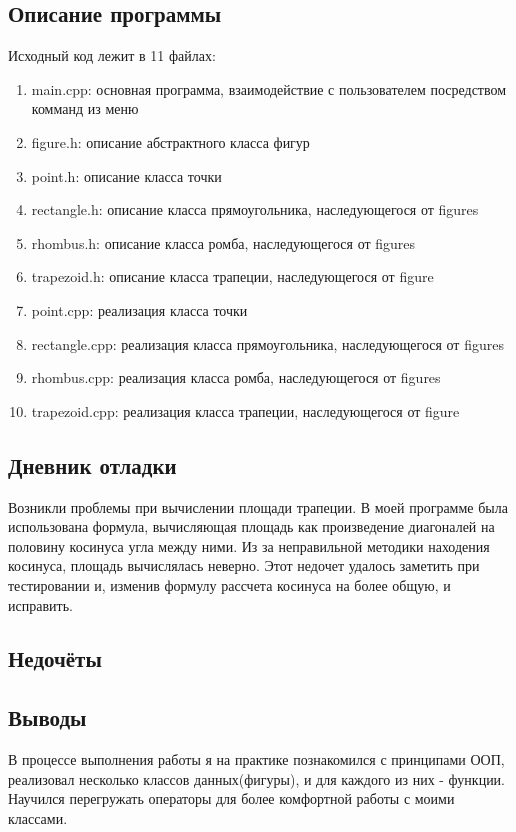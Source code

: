 \documentclass[12pt]{article}
\begin{document}
\subsection*{Описание программы}

Исходный код лежит в 11 файлах:
\begin{enumerate}
\item main.cpp: основная программа, взаимодействие с пользователем посредством комманд из меню

\item figure.h:    описание абстрактного класса фигур

\item point.h:     описание класса точки
\item rectangle.h:  описание класса прямоугольника, наследующегося от figures
\item rhombus.h: описание класса ромба, наследующегося от figures
\item trapezoid.h:    описание класса трапеции, наследующегося от figure

\item point.cpp:     реализация класса точки

\item rectangle.cpp: реализация класса прямоугольника, наследующегося от figures
\item rhombus.cpp:  реализация класса ромба, наследующегося от figures
\item trapezoid.cpp:    реализация класса трапеции, наследующегося от figure

\end{enumerate}

\subsection*{Дневник отладки}
Возникли проблемы при вычислении площади трапеции. В моей программе была использована формула, вычисляющая площадь как произведение диагоналей на половину косинуса угла между ними. Из за неправильной методики находения косинуса, площадь вычислялась неверно. Этот недочет удалось заметить при тестировании и, изменив формулу рассчета косинуса на более общую, и исправить.

\subsection*{Недочёты}


\subsection*{Выводы}
В процессе выполнения работы я на практике познакомился с принципами ООП, реализовал несколько классов данных(фигуры), и для каждого из них - функции. Научился перегружать операторы для более комфортной работы с моими классами.
\end{document}
